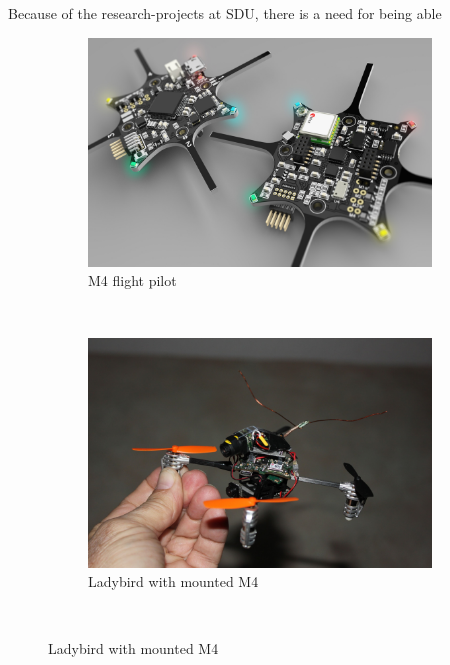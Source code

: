 Because of the research-projects at SDU, there is a need for being able 


\begin{figure}[H]
    \centering
    \begin{subfigure}[b]{0.3\textwidth}
        \includegraphics[width=\textwidth]{graphics/M4_demo}
        \caption{M4 flight pilot}
        \label{fig:gull}
    \end{subfigure}
    ~ %
    \begin{subfigure}[b]{0.3\textwidth}
        \includegraphics[width=\textwidth]{graphics/ladybird}
        \caption{Ladybird with mounted M4}
        \label{fig:tiger}
    \end{subfigure}
    ~ %

\end{figure}
